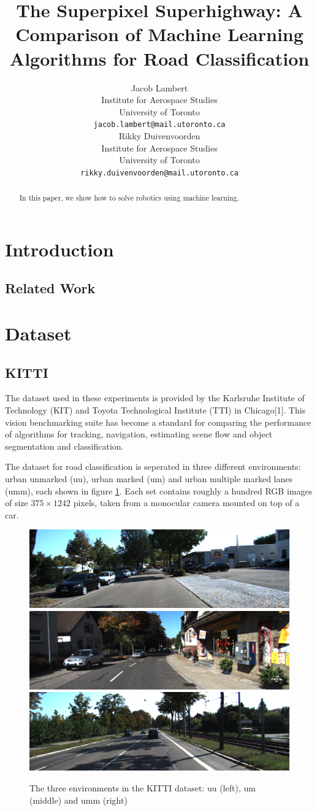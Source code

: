 \documentclass{article} %
\title{The Superpixel Superhighway: A Comparison of Machine Learning Algorithms for Road Classification}
\author{
Jacob Lambert\\
Institute for Aerospace Studies\\
University of Toronto\\
\texttt{jacob.lambert@mail.utoronto.ca} \\
\And
Rikky Duivenvoorden\\
Institute for Aerospace Studies\\
University of Toronto\\
\texttt{rikky.duivenvoorden@mail.utoronto.ca} \\
}
\begin{document}
\maketitle

\begin{abstract}
In this paper, we show how to solve robotics using machine learning.
\end{abstract}

\section{Introduction}

\subsection{Related Work}

\section{Dataset}
\subsection{KITTI}
The dataset used in these experiments is provided by the Karlsruhe Institute of Technology (KIT) and Toyota Technological Institute (TTI) in Chicago[1]. This vision benchmarking suite has become a standard for comparing the performance of algorithms for tracking, navigation, estimating scene flow and object segmentation and classification.

The dataset for road classification is seperated in three different environments: urban unmarked (uu), urban marked (um) and urban multiple marked lanes (umm), each shown in figure \ref{fig:kitti}. Each set contains roughly a hundred RGB images of size $375\times1242$ pixels, taken from a monocular camera mounted on top of a car.

\begin{figure}[ht!]
\centering
 \includegraphics[width=0.3333\linewidth]{figs/uu_example.png}\hspace{-3pt}
 \includegraphics[width=0.3333\linewidth]{figs/um_example.png}\hspace{-3pt}
 \includegraphics[width=0.3333\linewidth]{figs/umm_example.png}
\caption{The three environments in the KITTI dataset: uu (left), um (middle) and umm (right)}\label{fig:kitti}
\end{figure}
\end{document}
